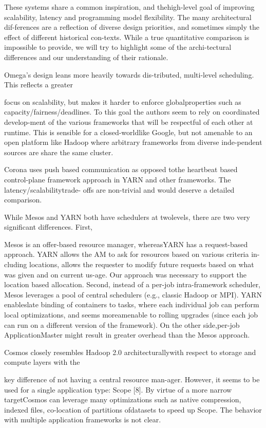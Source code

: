 These systems share a common inspiration, and thehigh-level goal of improving scalability, latency and programming model flexibility. The many architectural dif-ferences are a reflection of diverse design priorities, and
sometimes simply the effect of different historical con-texts. While a true quantitative comparison is impossible
to provide, we will try to highlight some of the archi-tectural differences and our understanding of their rationale.

Omega's design leans more heavily towards dis-tributed, multi-level scheduling. This reflects a greater

focus on scalability, but makes it harder to enforce globalproperties such as capacity/fairness/deadlines. To this
goal the authors seem to rely on coordinated develop-ment of the various frameworks that will be respectful of
each other at runtime. This is sensible for a closed-worldlike Google, but not amenable to an open platform like
Hadoop where arbitrary frameworks from diverse inde-pendent sources are share the same cluster.

Corona uses push based communication as opposed tothe heartbeat based control-plane framework approach
in YARN and other frameworks. The latency/scalabilitytrade- offs are non-trivial and would deserve a detailed
comparison.

While Mesos and YARN both have schedulers at twolevels, there are two very significant differences. First,

Mesos is an offer-based resource manager, whereasYARN has a request-based approach. YARN allows the
AM to ask for resources based on various criteria in-cluding locations, allows the requester to modify future
requests based on what was given and on current us-age. Our approach was necessary to support the location based allocation. Second, instead of a per-job intra-framework scheduler, Mesos leverages a pool of central
schedulers (e.g., classic Hadoop or MPI). YARN enableslate binding of containers to tasks, where each individual job can perform local optimizations, and seems moreamenable to rolling upgrades (since each job can run on
a different version of the framework). On the other side,per-job ApplicationMaster might result in greater overhead than the Mesos approach.

Cosmos closely resembles Hadoop 2.0 architecturallywith respect to storage and compute layers with the

key difference of not having a central resource man-ager. However, it seems to be used for a single application type: Scope [8]. By virtue of a more narrow targetCosmos can leverage many optimizations such as native
compression, indexed files, co-location of partitions ofdatasets to speed up Scope. The behavior with multiple
application frameworks is not clear.

